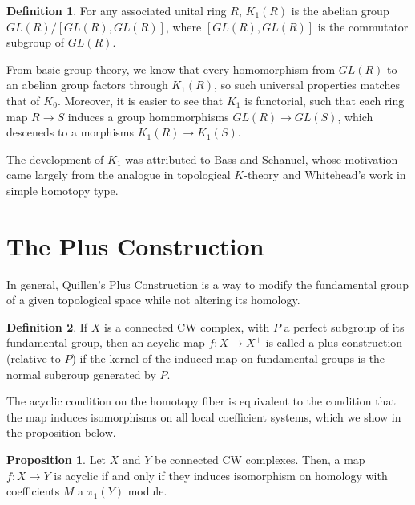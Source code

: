 \documentclass{article}
\theoremstyle{definition}
\theoremstyle{definition}
\newtheorem{definition}{Definition}[theorem]
\theoremstyle{definition}
\theoremstyle{definition}
\newtheorem{proposition}{Proposition}[theorem]
\theoremstyle{definition}
\theoremstyle{definition}
\theoremstyle{definition}
\begin{document}
\begin{tcolorbox}[colback=purple!5!white,colframe=purple!75!black]
\begin{definition}
    For any associated unital ring $R$, $K_1(R)$ is the abelian group $GL(R)/[GL(R),GL(R)]$, where $[GL(R),GL(R)]$ is the commutator subgroup of $GL(R)$. 
\end{definition}
\end{tcolorbox}
From basic group theory, we know that every homomorphism from $GL(R)$ to an abelian group factors through $K_1(R)$, so such universal properties matches that of $K_0$. Moreover, it is easier to see that $K_1$ is functorial, such that each ring map $R\xrightarrow{}S$ induces a group homomorphisms $GL(R)\xrightarrow{}GL(S)$, which desceneds to a morphisms $K_1(R)\xrightarrow{}K_1(S)$.

The development of $K_1$ was attributed to Bass and Schanuel, whose motivation came largely from the analogue in topological $K$-theory and Whitehead's work in simple homotopy type.

\section{The Plus Construction}
In general, Quillen's Plus Construction is a way to modify the fundamental group of a given topological space while not altering its homology. 

\begin{tcolorbox}[colback=purple!5!white,colframe=purple!75!black]
\begin{definition}
    If $X$ is a connected CW complex, with $P$ a perfect subgroup of its fundamental group, then an acyclic map $f:X\xrightarrow{}X^{+}$ is called a plus construction (relative to $P$) if the kernel of the induced map on fundamental groups is the normal subgroup generated by $P$. 
\end{definition}
\end{tcolorbox}
The acyclic condition on the homotopy fiber is equivalent to the condition that the map induces isomorphisms on all local coefficient systems, which we show in the proposition below. 

\begin{tcolorbox}[colback=blue!5!white,colframe=blue!30!white]
\begin{proposition}
    Let $X$ and $Y$ be connected CW complexes. Then, a map $f:X\xrightarrow{}Y$ is acyclic if and only if they induces isomorphism on homology with coefficients $M$ a $\pi_1(Y)$ module.
\end{proposition}
\end{tcolorbox}
\end{document}
